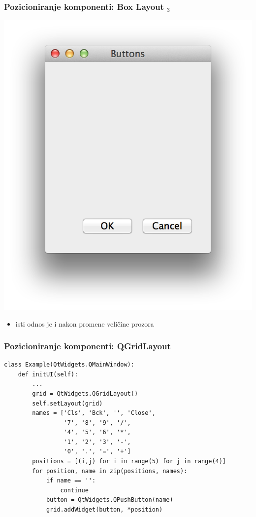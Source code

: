 \documentclass[utf8,compress]{beamer}
\begin{document}
\begin{frame}[fragile]
  \frametitle{Pozicioniranje komponenti: Box Layout $_3$}
\begin{center}
\includegraphics[scale=0.4]{pyqt07.png}
\end{center}
  \begin{itemize}
    \item isti odnos je i nakon promene veličine prozora
  \end{itemize}
\end{frame}

\begin{frame}[fragile,shrink=8]
  \frametitle{Pozicioniranje komponenti: QGridLayout}
\begin{verbatim}
class Example(QtWidgets.QMainWindow):
    def initUI(self):
        ...
        grid = QtWidgets.QGridLayout()
        self.setLayout(grid)
        names = ['Cls', 'Bck', '', 'Close',
                 '7', '8', '9', '/',
                 '4', '5', '6', '*',
                 '1', '2', '3', '-',
                 '0', '.', '=', '+']
        positions = [(i,j) for i in range(5) for j in range(4)]
        for position, name in zip(positions, names):
            if name == '':
                continue
            button = QtWidgets.QPushButton(name)
            grid.addWidget(button, *position)
\end{verbatim}
\end{frame}
\end{document}
